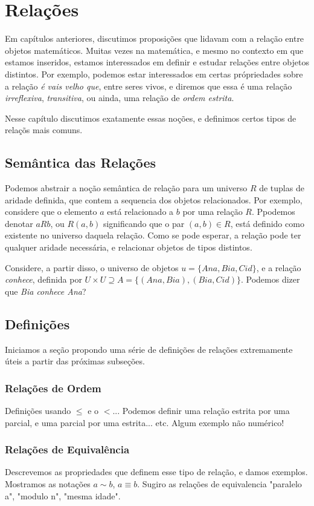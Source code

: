 \chapter{Relações}
Em capítulos anteriores, discutimos proposições que lidavam com a relação entre objetos matemáticos. Muitas vezes na matemática, e mesmo no contexto em que estamos inseridos, estamos interessados em definir e estudar relações entre objetos distintos. Por exemplo, podemos estar interessados em certas própriedades sobre a relação \textit{é vais velho que}, entre seres vivos, e diremos que essa é uma relação \textit{irreflexiva}, \textit{transitiva}, ou ainda, uma relação de \textit{ordem estrita}.

Nesse capítulo discutimos exatamente essas noções, e definimos certos tipos de relaçõs mais comuns.

\section{Semântica das Relações}
Podemos abstrair a noção semântica de relação para um universo $R$ de tuplas de aridade definida, que contem a sequencia dos objetos relacionados. Por exemplo, considere que o elemento $a$ está relacionado a $b$ por uma relação $R$. Ppodemos denotar $aRb$, ou $R(a,b)$ significando que o par $(a,b)\in R$, está definido como existente no universo daquela relação. Como se pode esperar, a relação pode ter qualquer aridade necessária, e relacionar objetos de tipos distintos.

Considere, a partir disso, o universo de objetos $u = \{Ana, Bia, Cid\}$, e a relação \textit{conhece}, definida por $U\times U \supseteq A = \{(Ana, Bia), (Bia, Cid)\}$. Podemos dizer que \textit{Bia conhece Ana}?

\section{Definições}
Iniciamos a seção propondo uma série de definições de relações extremamente úteis a partir das próximas subseções.

\subsection{Relações de Ordem}
Definições usando $\leq$ e o $<$... Podemos definir uma relação estrita por uma parcial, e uma parcial por uma estrita... etc. Algum exemplo não numérico!

\subsection{Relações de Equivalência}
Descrevemos as propriedades que definem esse tipo de relação, e damos exemplos. Mostramos as notações $a\sim b $, $a\equiv b$. Sugiro as relações de equivalencia "paralelo a", "modulo n", "mesma idade".

